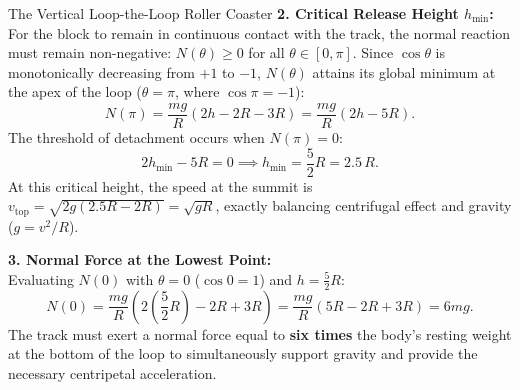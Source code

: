\begin{workedexample}{The Vertical Loop-the-Loop Roller Coaster}
\textbf{2. Critical Release Height $h_{\min}$:}\\
For the block to remain in continuous contact with the track, the normal reaction must remain non-negative: $N(\theta) \ge 0$ for all $\theta \in [0, \pi]$. Since $\cos\theta$ is monotonically decreasing from $+1$ to $-1$, $N(\theta)$ attains its global minimum at the apex of the loop ($\theta = \pi$, where $\cos\pi = -1$):
\[
N(\pi) = \frac{mg}{R}\left( 2h - 2R - 3R \right) = \frac{mg}{R}(2h - 5R).
\]
The threshold of detachment occurs when $N(\pi) = 0$:
\[
2h_{\min} - 5R = 0 \implies h_{\min} = \frac{5}{2}R = 2.5\,R.
\]
At this critical height, the speed at the summit is $v_{\text{top}} = \sqrt{2g(2.5R - 2R)} = \sqrt{gR}$, exactly balancing centrifugal effect and gravity ($g = v^2/R$).

\textbf{3. Normal Force at the Lowest Point:}\\
Evaluating $N(0)$ with $\theta = 0$ ($\cos 0 = 1$) and $h = \frac{5}{2}R$:
\[
N(0) = \frac{mg}{R}\left( 2\left(\frac{5}{2}R\right) - 2R + 3R \right) = \frac{mg}{R}(5R - 2R + 3R) = 6mg.
\]
The track must exert a normal force equal to \textbf{six times} the body's resting weight at the bottom of the loop to simultaneously support gravity and provide the necessary centripetal acceleration.
\end{workedexample}

